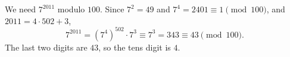 We need $7^{2011}$ modulo $100$. Since $7^2=49$ and $7^4=2401\equiv1\pmod{100}$, and $2011=4\cdot502+3$,
\[7^{2011}=\left(7^4\right)^{502}\cdot7^3\equiv7^3=343\equiv43\pmod{100}.\]
The last two digits are $43$, so the tens digit is $\boxed{4}$.
